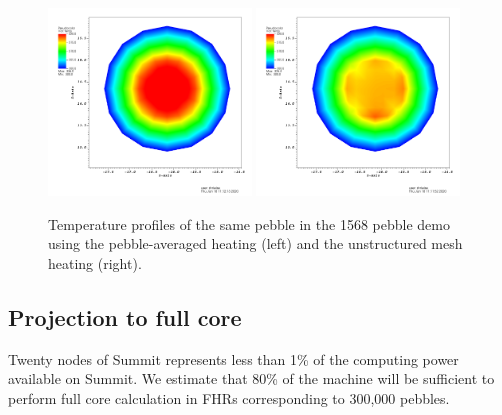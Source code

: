 \begin{figure}[!h]
\centering
\includegraphics[clip=true,width=0.48\textwidth]{Figures/openmc_cell_temperature_zoomed}
\includegraphics[clip=true,width=0.48\textwidth]{Figures/openmc_mesh_temperature_zoomed}
\caption{Temperature profiles of the same pebble in the 1568 pebble demo using the pebble-averaged heating (left) and the unstructured mesh heating (right).}
\label{f:1568_openmc_temperatures_single_pebble}
\end{figure}

\subsection{Projection to full core}

Twenty nodes of Summit represents less than 1\% of the computing power available on Summit. We estimate that 80\% of the machine will be sufficient to perform full core calculation in FHRs corresponding to 300,000 pebbles.
